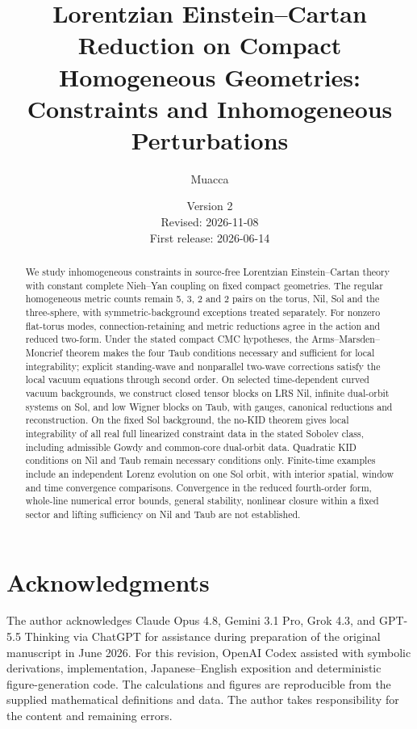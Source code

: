 \documentclass[11pt,a4paper]{article}
\title{Lorentzian Einstein--Cartan Reduction on Compact Homogeneous Geometries: Constraints and Inhomogeneous Perturbations}
\author{Muacca}\date{Version 2\\Revised: 2026-11-08\\First release: 2026-06-14}
\begin{document}
\maketitle\begin{abstract}
We study inhomogeneous constraints in source-free Lorentzian Einstein--Cartan theory with constant complete Nieh--Yan coupling on fixed compact geometries. The regular homogeneous metric counts remain 5, 3, 2 and 2 pairs on the torus, Nil, Sol and the three-sphere, with symmetric-background exceptions treated separately. For nonzero flat-torus modes, connection-retaining and metric reductions agree in the action and reduced two-form. Under the stated compact CMC hypotheses, the Arms--Marsden--Moncrief theorem makes the four Taub conditions necessary and sufficient for local integrability; explicit standing-wave and nonparallel two-wave corrections satisfy the local vacuum equations through second order. On selected time-dependent curved vacuum backgrounds, we construct closed tensor blocks on LRS Nil, infinite dual-orbit systems on Sol, and low Wigner blocks on Taub, with gauges, canonical reductions and reconstruction. On the fixed Sol background, the no-KID theorem gives local integrability of all real full linearized constraint data in the stated Sobolev class, including admissible Gowdy and common-core dual-orbit data. Quadratic KID conditions on Nil and Taub remain necessary conditions only. Finite-time examples include an independent Lorenz evolution on one Sol orbit, with interior spatial, window and time convergence comparisons. Convergence in the reduced fourth-order form, whole-line numerical error bounds, general stability, nonlinear closure within a fixed sector and lifting sufficiency on Nil and Taub are not established.
\end{abstract}








\section*{Acknowledgments}
The author acknowledges Claude Opus 4.8, Gemini 3.1 Pro, Grok 4.3, and GPT-5.5 Thinking via ChatGPT for assistance during preparation of the original manuscript in June 2026. For this revision, OpenAI Codex assisted with symbolic derivations, implementation, Japanese--English exposition and deterministic figure-generation code. The calculations and figures are reproducible from the supplied mathematical definitions and data. The author takes responsibility for the content and remaining errors.
\end{document}
